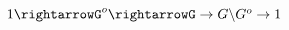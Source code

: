 \documentclass[preview]{standalone}
\begin{document}
\begin{center}
$1 \rightarrowG^{o} \rightarrowG\rightarrow G\backslash G^{o} \rightarrow1$
\end{center}
\end{document}

